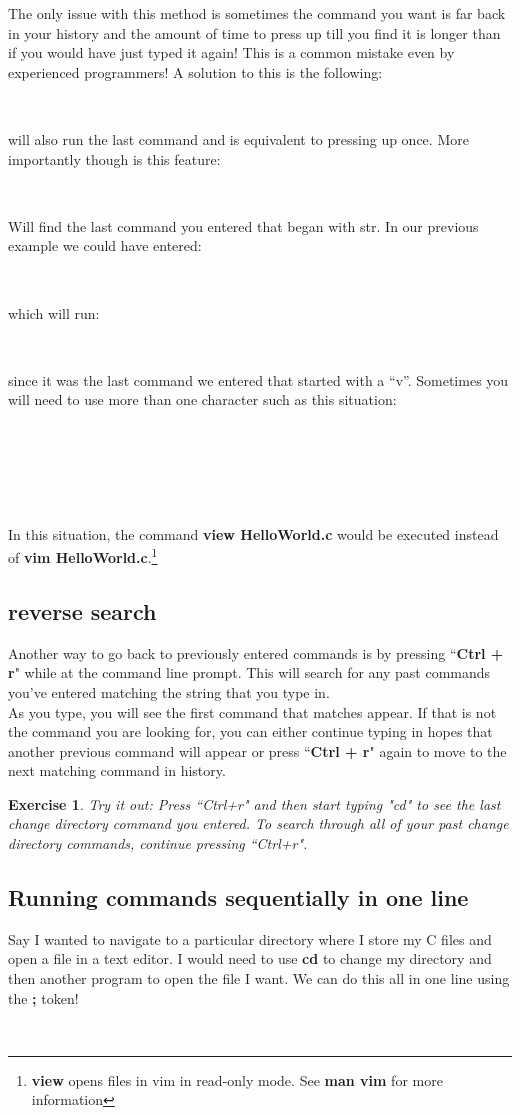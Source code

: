 \documentclass[oneside]{book}
\newcommand{\commandline}[1]{\begin{center} \colorbox{Dark}{\textcolor{white}{#1}} \end{center}}
\newtheorem{ex}{Exercise}[chapter]
\begin{document}
The only issue with this method is sometimes the command you want is far back in your history and the amount of time to press up till you find it is longer than if you would have just typed it again! This is a common mistake even by experienced programmers! A solution to this is the following:
\commandline{!!}
will also run the last command and is equivalent to pressing up once. More importantly though is this feature:
\commandline{!str}
Will find the last command you entered that began with str. In our previous example we could have entered:
\commandline{!v}
which will run:
\commandline{vim HelloWorld.c}
since it was the last command we entered that started with a ``v''. Sometimes you will need to use more than one character such as this situation:
\commandline{vim HelloWorld.c}
\commandline{view HelloWorld.c}
\commandline{!v}

In this situation, the command \textbf{view HelloWorld.c} would be executed instead of \textbf{vim HelloWorld.c}.\footnote{\textbf{view} opens files in vim in read-only mode. See \textbf{man vim} for more information}

\subsection{reverse search}
Another way to go back to previously entered commands is by pressing ``\textbf{Ctrl + r}" while at the command line prompt.  This will search for any past commands you've entered matching the string that you type in.  \\
As you type, you will see the first command that matches appear.  If that is not the command you are looking for, you can either continue typing in hopes that another previous command will appear or press ``\textbf{Ctrl + r}" again to move to the next matching command in history.

\vspace{0.5cm}

\begin{ex}
Try it out: Press ``Ctrl+r" and then start typing "cd" to see the last change directory command you entered. To search through all of your past change directory commands, continue pressing ``Ctrl+r". 
\end{ex}

\subsection{Running commands sequentially in one line}
Say I wanted to navigate to a particular directory where I store my C files and open a file in a text editor. I would need to use \textbf{cd} to change my directory and then another program to open the file I want. We can do this all in one line using the \textbf{;} token!
\commandline{cd demo/c\_programs ; vim HelloWorld.c}
\end{document}
